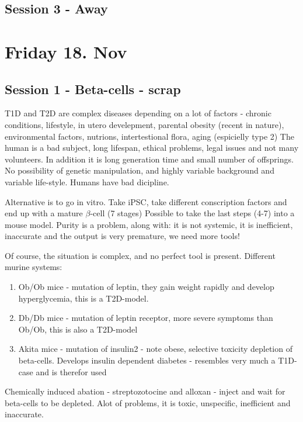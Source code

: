 \documentclass[12p]{article}
\begin{document}
\subsection*{Session 3 - Away}
\section*{Friday 18. Nov}

\subsection*{Session 1 - Beta-cells - scrap}

T1D and T2D are complex diseases depending on a lot of factors - chronic conditions, lifestyle, in utero develepment, parental obesity (recent in nature), environmental factors, nutrions, intertestional flora, aging (espicielly type 2)
The human is a bad subject, long lifespan, ethical problems, legal issues and not many volunteers.
In addition it is long generation time and small number of offsprings.
No possibility of genetic manipulation, and highly variable background and variable life-style.
Humans have bad dicipline.

Alternative is to go in vitro.
Take iPSC, take different conscription factors and end up with a mature $\beta$-cell (7 stages)
Possible to take the last steps (4-7) into a mouse model.
Purity is a problem, along with: it is not systemic, it is inefficient, inaccurate and the output is very premature, we need more tools!

Of course, the situation is complex, and no perfect tool is present.
Different murine systems:

\begin{enumerate}
    \item
	Ob/Ob mice - mutation of leptin, they gain weight rapidly and develop hyperglycemia, this is a T2D-model.
    \item
	Db/Db mice - mutation of leptin receptor, more severe symptoms than Ob/Ob, this is also a T2D-model
    \item
	Akita mice - mutation of insulin2 - note obese, selective toxicity depletion of beta-cells. Develops insulin dependent diabetes - resembles very much a T1D-case and is therefor used 
\end{enumerate}

Chemically induced abation - streptozotocine and alloxan - inject and wait for beta-cells to be depleted.
Alot of problems, it is toxic, unspecific, inefficient and inaccurate.
\end{document}
